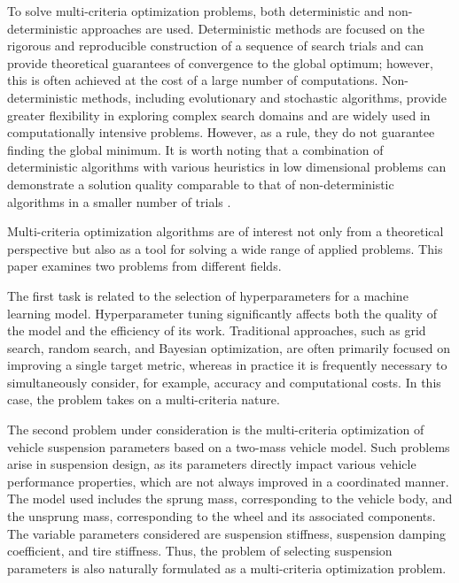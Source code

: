 \documentclass[a4paper]{llncs}
\begin{document}
To solve multi-criteria optimization problems, both deterministic \cite{MCO_ML_2023,Ehrgott2005,Evtushenko2014,Konnov2025,Miettinen1999,Pardalos2017} and non-deterministic approaches \cite{Akiba2019Optuna,Durillo2010,Deb2002,Mostaghim2007,Nebro2009,RC05,ZLT01} are used. Deterministic methods are focused on the rigorous and reproducible construction of a sequence of search trials and can provide theoretical guarantees of convergence to the global optimum; however, this is often achieved at the cost of a large number of computations. Non-deterministic methods, including evolutionary and stochastic algorithms, provide greater flexibility in exploring complex search domains and are widely used in computationally intensive problems. However, as a rule, they do not guarantee finding the global minimum. It is worth noting that a combination of deterministic algorithms with various heuristics in low dimensional problems can demonstrate a solution quality comparable to that of non-deterministic algorithms in a smaller number of trials \cite{Barkalov2026Hyperparameter}.

Multi-criteria optimization algorithms are of interest not only from a theoretical perspective but also as a tool for solving a wide range of applied problems. This paper examines two problems from different fields.

The first task is related to the selection of hyperparameters for a machine learning model. Hyperparameter tuning significantly affects both the quality of the model and the efficiency of its work. Traditional approaches, such as grid search, random search, and Bayesian optimization, are often primarily focused on improving a single target metric, whereas in practice it is frequently necessary to simultaneously consider, for example, accuracy and computational costs. In this case, the problem takes on a multi-criteria nature.

The second problem under consideration is the multi-criteria optimization of vehicle suspension parameters based on a two-mass vehicle model. Such problems arise in suspension design, as its parameters directly impact various vehicle performance properties, which are not always improved in a coordinated manner. The model used includes the sprung mass, corresponding to the vehicle body, and the unsprung mass, corresponding to the wheel and its associated components. The variable parameters considered are suspension stiffness, suspension damping coefficient, and tire stiffness. Thus, the problem of selecting suspension parameters is also naturally formulated as a multi-criteria optimization problem.
\end{document}
